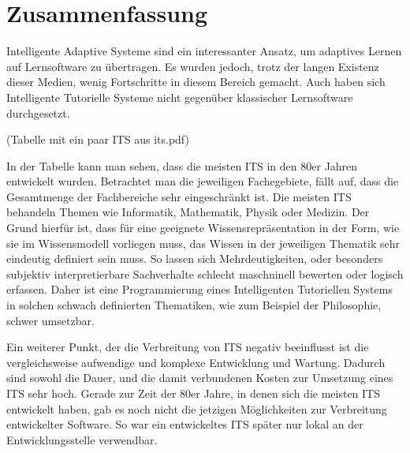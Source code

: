 \chapter{Zusammenfassung}
Intelligente Adaptive Systeme sind ein interessanter Ansatz, um adaptives Lernen auf
Lernsoftware zu übertragen. Es wurden jedoch, trotz der langen Existenz dieser Medien,
wenig Fortschritte in diesem Bereich gemacht. Auch haben sich Intelligente Tutorielle Systeme
nicht gegenüber klassischer Lernsoftware durchgesetzt.

(Tabelle mit ein paar ITS aus its.pdf)

In der Tabelle kann man sehen, dass die meisten ITS in den 80er Jahren entwickelt wurden.
Betrachtet man die jeweiligen Fachegebiete, fällt auf, dass die Gesamtmenge der Fachbereiche
sehr eingeschränkt ist. Die meisten ITS behandeln Themen wie Informatik, Mathematik, Physik
oder Medizin. Der Grund hierfür ist, dass für eine geeignete Wissensrepräsentation in der Form,
wie sie im Wissensmodell vorliegen muss, das Wissen in der jeweiligen Thematik sehr eindeutig
definiert sein muss. So lassen sich Mehrdeutigkeiten, oder besonders subjektiv interpretierbare
Sachverhalte schlecht maschninell bewerten oder logisch erfassen. Daher ist eine Programmierung
eines Intelligenten Tutoriellen Systems in solchen schwach definierten Thematiken, wie zum Beispiel
der Philosophie, schwer umsetzbar.

Ein weiterer Punkt, der die Verbreitung von ITS negativ beeinflusst ist die vergleichsweise
aufwendige und komplexe Entwicklung und Wartung. Dadurch sind sowohl die Dauer, und die
damit verbundenen Kosten zur Umsetzung eines ITS sehr hoch. Gerade zur Zeit der 80er Jahre,
in denen sich die meisten ITS entwickelt haben, gab es noch nicht die jetzigen Möglichkeiten zur
Verbreitung entwickelter Software. So war ein entwickeltes ITS später nur lokal an der Entwicklungsstelle
verwendbar.

